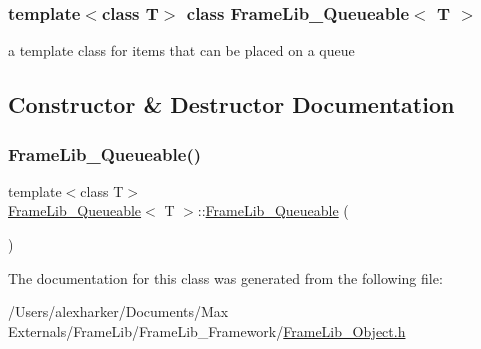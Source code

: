 \subsubsection*{template$<$class T$>$\newline
class Frame\+Lib\+\_\+\+Queueable$<$ T $>$}

a template class for items that can be placed on a queue 

\subsection{Constructor \& Destructor Documentation}
\mbox{\label{class_frame_lib___queueable_ae851e341082e42b5d9f35fce31f51870}} 
\subsubsection{\texorpdfstring{Frame\+Lib\+\_\+\+Queueable()}{FrameLib\_Queueable()}}
{\footnotesize\ttfamily template$<$class T$>$ \\
\hyperlink{class_frame_lib___queueable}{Frame\+Lib\+\_\+\+Queueable}$<$ T $>$\+::\hyperlink{class_frame_lib___queueable}{Frame\+Lib\+\_\+\+Queueable} (\begin{DoxyParamCaption}{ }\end{DoxyParamCaption})\hspace{0.3cm}{\ttfamily [inline]}}



The documentation for this class was generated from the following file\+:\begin{DoxyCompactItemize}
\item 
/\+Users/alexharker/\+Documents/\+Max Externals/\+Frame\+Lib/\+Frame\+Lib\+\_\+\+Framework/\hyperlink{_frame_lib___object_8h}{Frame\+Lib\+\_\+\+Object.\+h}\end{DoxyCompactItemize}

